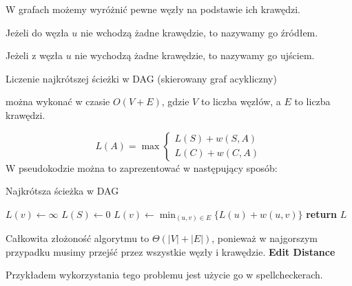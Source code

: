 \documentclass{article}
\begin{document}
    \vspace{1\baselineskip}
    W grafach możemy wyróżnić pewne węzły na podstawie ich krawędzi. \par
    Jeżeli do węzła $u$ nie wchodzą żadne krawędzie, to nazywamy go źródłem. \par
    Jeżeli z węzła $u$ nie wychodzą żadne krawędzie, to nazywamy go ujściem. \par
    Liczenie najkrótszej ścieżki w DAG (skierowany graf acykliczny) \par
    można wykonać w czasie $O(V + E)$, gdzie $V$ to liczba węzłów, a $E$ to liczba krawędzi. \par
    \[
        L(A) = \max \begin{cases}
            L(S)+w(S, A) \\
            L(C)+w(C, A)
        \end{cases}
    \] 
    \newpage
    \vspace{1\baselineskip}
    W pseudokodzie można to zaprezentować w następujący sposób: \par
    \begin{center} 
        \begin{algorithm}
            \caption{Najkrótsza ścieżka w DAG}
            \begin{algorithmic}[1]

                \Statex {}
                \State $L(v) \gets \infty$
                \EndFor
                \State $L(S) \gets 0$
                \Statex {}
                \State $L(v) \gets \min_{(u,v) \in E}\{L(u)+w(u,v)\}$
                \EndFor
                \Statex
                \State \textbf{return} $L$
                \EndProcedure
            \end{algorithmic}
        \end{algorithm}
    \end{center}
    Całkowita złożoność algorytmu to $\Theta(|V|+|E|)$, ponieważ w najgorszym przypadku musimy przejść przez wszystkie węzły i krawędzie.
    \vspace{1\baselineskip}
    \textbf{Edit Distance} \par
    \vspace{1\baselineskip}
    Przykładem wykorzystania tego problemu jest użycie go w spellcheckerach. \par
\end{document}
